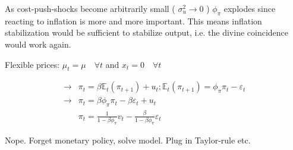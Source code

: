 {\begin{enumerate}[label=(\arabic*)]
{As cost-push-shocks become arbitrarily small ( $\sigma^{2}_u \rightarrow 0$ ) $\phi_\pi$ explodes since reacting to inflation is more and more important. This means inflation stabilization would be sufficient to stabilize output, i.e. the divine coincidence would work again.
}
{
\item 
Flexible prices: $\mu_{t}=\mu \quad \forall t$ and $x_{t}=0 \quad \forall t$

$$
\begin{aligned}
\longrightarrow & \pi_{t}=\beta \mathbb{E}_{t}\left(\pi_{t+1}\right)+u_{t} ; \mathbb{E}_{t}\left(\pi_{t+1}\right)=\phi_{\pi} \pi_{t}-\varepsilon_{t} \\
\longrightarrow & \pi_{t}=\beta \phi_{\pi} \pi_{t}-\beta \varepsilon_{t}+u_{t} \\
& \pi_{t}=\frac{1}{1-\beta \phi_{\pi}} v_{t}-\frac{\beta}{1-\beta \phi_{\pi}} \varepsilon_{t}
\end{aligned}
$$

\color{red} Nope. Forget monetary policy, solve model. Plug in Taylor-rule etc. \color{black}
}
\end{enumerate}
}
